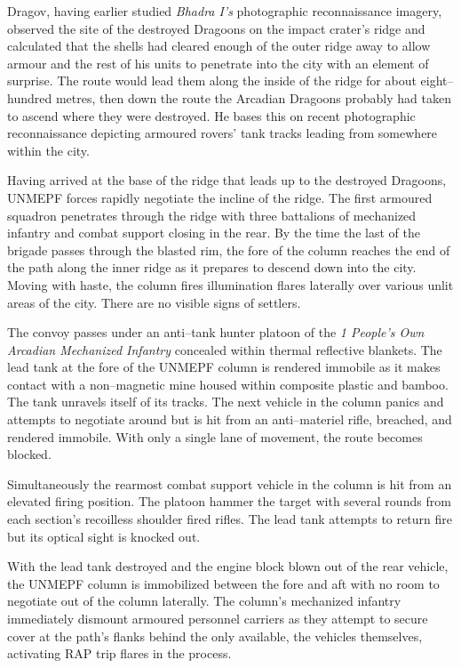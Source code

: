 Dragov, having earlier studied {\it Bhadra I's} photographic reconnaissance imagery, observed the site of the destroyed Dragoons on the impact crater's ridge and calculated that the shells had cleared enough of the outer ridge away to allow armour and the rest of his units to penetrate into the city with an element of surprise. The route would lead them along the inside of the ridge for about eight--hundred metres, then down the route the Arcadian Dragoons probably had taken to ascend where they were destroyed. He bases this on recent photographic reconnaissance depicting armoured rovers' tank tracks leading from somewhere within the city.

Having arrived at the base of the ridge that leads up to the destroyed Dragoons, UNMEPF forces rapidly negotiate the incline of the ridge. The first armoured squadron penetrates through the ridge with three battalions of mechanized infantry and combat support closing in the rear. By the time the last of the brigade passes through the blasted rim, the fore of the column reaches the end of the path along the inner ridge as it prepares to descend down into the city. Moving with haste, the column fires illumination flares laterally over various unlit areas of the city. There are no visible signs of settlers.

The convoy passes under an anti--tank hunter platoon of the {\it 1 People's Own Arcadian Mechanized Infantry} concealed within thermal reflective blankets. The lead tank at the fore of the UNMEPF column is rendered immobile as it makes contact with a non--magnetic mine housed within composite plastic and bamboo. The tank unravels itself of its tracks. The next vehicle in the column panics and attempts to negotiate around but is hit from an anti--materiel rifle, breached, and rendered immobile. With only a single lane of movement, the route becomes blocked.

Simultaneously the rearmost combat support vehicle in the column is hit from an elevated firing position. The platoon hammer the target with several rounds from each section's recoilless shoulder fired rifles. The lead tank attempts to return fire but its optical sight is knocked out.

With the lead tank destroyed and the engine block blown out of the rear vehicle, the UNMEPF column is immobilized between the fore and aft with no room to negotiate out of the column laterally. The column's mechanized infantry immediately dismount armoured personnel carriers as they attempt to secure cover at the path's flanks behind the only available, the vehicles themselves, activating RAP trip flares in the process.

